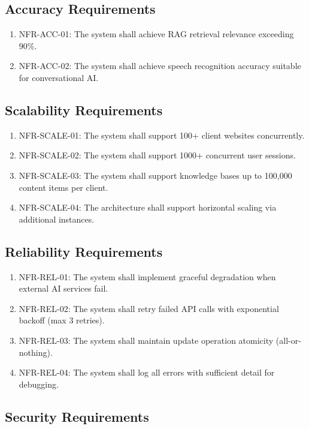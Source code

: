 \subsection{Accuracy Requirements}

\begin{enumerate}[leftmargin=*]
    \item NFR-ACC-01: The system shall achieve RAG retrieval relevance exceeding 90\%.
    \item NFR-ACC-02: The system shall achieve speech recognition accuracy suitable for conversational AI.
\end{enumerate}

\subsection{Scalability Requirements}

\begin{enumerate}[leftmargin=*]
    \item NFR-SCALE-01: The system shall support 100+ client websites concurrently.
    \item NFR-SCALE-02: The system shall support 1000+ concurrent user sessions.
    \item NFR-SCALE-03: The system shall support knowledge bases up to 100,000 content items per client.
    \item NFR-SCALE-04: The architecture shall support horizontal scaling via additional instances.
\end{enumerate}

\subsection{Reliability Requirements}

\begin{enumerate}[leftmargin=*]
    \item NFR-REL-01: The system shall implement graceful degradation when external AI services fail.
    \item NFR-REL-02: The system shall retry failed API calls with exponential backoff (max 3 retries).
    \item NFR-REL-03: The system shall maintain update operation atomicity (all-or-nothing).
    \item NFR-REL-04: The system shall log all errors with sufficient detail for debugging.
\end{enumerate}

\subsection{Security Requirements}

